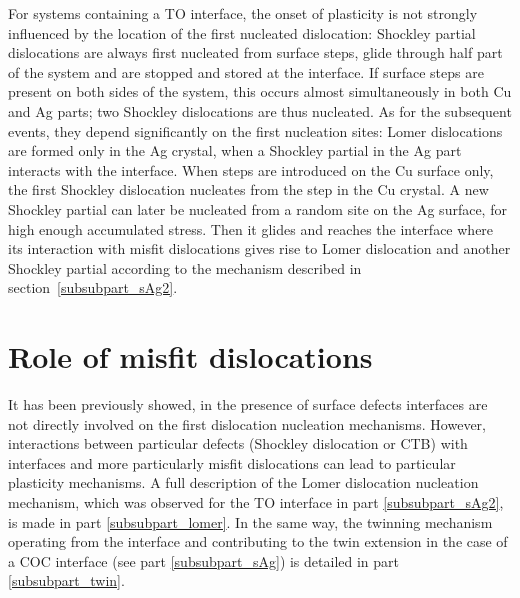 \documentclass[final,3p,times,twocolumn]{elsarticle}
\begin{document}
For systems containing a TO interface, the onset of plasticity is not strongly influenced by the location of the first nucleated dislocation: Shockley partial dislocations are always first nucleated from surface steps, glide through half part of the system and are stopped and stored at the interface. If surface steps are present on both sides of the system, this occurs almost simultaneously in both Cu and Ag parts; two Shockley dislocations are thus nucleated.
As for the subsequent events, they depend significantly on the first nucleation sites: Lomer dislocations are formed only in the Ag crystal, when a Shockley partial in the Ag part interacts with the interface. When steps are introduced on the Cu surface only, the first Shockley dislocation nucleates from the step in the Cu crystal. A new Shockley partial can later be nucleated from a random site on the Ag surface, for high enough accumulated stress. Then it glides and reaches the interface where its interaction with misfit dislocations gives rise to Lomer dislocation and another Shockley partial according to the mechanism described in section~\ref{subsubpart_sAg2}.
 
\section{Role of misfit dislocations}
\label{part_misfit}

It has been previously showed, in the presence of surface defects interfaces are not directly involved on the first dislocation nucleation mechanisms. However, interactions between particular defects (Shockley dislocation or CTB) with interfaces and more particularly misfit dislocations can lead to particular plasticity mechanisms. A full description of the Lomer dislocation nucleation mechanism, which was observed for the TO interface in part \ref{subsubpart_sAg2}, is made in part \ref{subsubpart_lomer}. In the same way, the twinning mechanism operating from the interface and contributing to the twin extension in the case of a COC interface (see part \ref{subsubpart_sAg}) is detailed in part \ref{subsubpart_twin}.  
\end{document}
